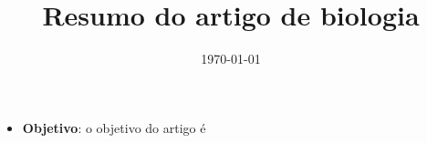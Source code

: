 \documentclass[12pt]{article}
\title{Resumo do artigo de biologia}
\date{\today}
\begin{document}
\maketitle
\begin{itemize}
 \item \textbf{Objetivo}: o objetivo do artigo é
\end{itemize}
\end{document}
